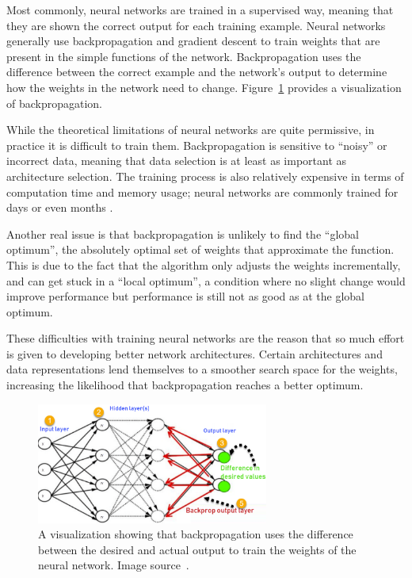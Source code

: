 \documentclass{article}
\begin{document}
Most commonly, neural networks are trained in a supervised way, meaning that they are shown the correct output for each training example. Neural networks generally use backpropagation and gradient descent to train weights that are present in the simple functions of the network. Backpropagation uses the difference between the correct example and the network's output to determine how the weights in the network need to change. Figure~\ref{figure:backpropagation} provides a visualization of backpropagation.

While the theoretical limitations of neural networks are quite permissive, in practice it is difficult to train them. Backpropagation is sensitive to ``noisy'' or incorrect data, meaning that data selection is at least as important as architecture selection. The training process is also relatively expensive in terms of computation time and memory usage; neural networks are commonly trained for days or even months \cite{attn_all_you_need}.

Another real issue is that backpropagation is unlikely to find the ``global optimum'', the absolutely optimal set of weights that approximate the function. This is due to the fact that the algorithm only adjusts the weights incrementally, and can get stuck in a ``local optimum'', a condition where no slight change would improve performance but performance is still not as good as at the global optimum.

These difficulties with training neural networks are the reason that so much effort is given to developing better network architectures. Certain architectures and data representations lend themselves to a smoother search space for the weights, increasing the likelihood that backpropagation reaches a better optimum.

\begin{figure}
    \centering
    \includegraphics[width=3in]{figures/backpropagation.png}
    \caption{A visualization showing that backpropagation uses the difference between the desired and actual output to train the weights of the neural network. Image source~\protect\cite{backprop}.}\label{figure:backpropagation}
\end{figure}



\end{document}
